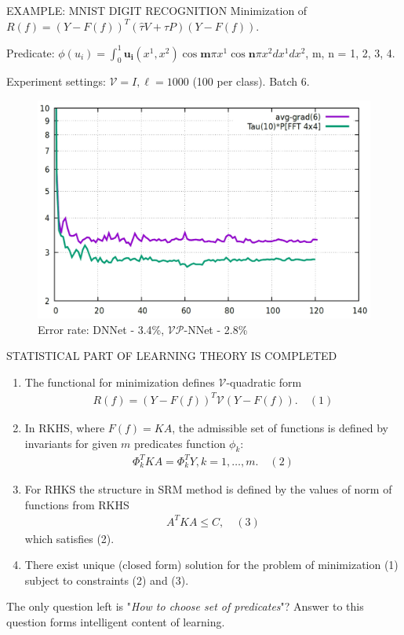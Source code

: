\documentclass[11pt]{beamer}
\begin{document}
\begin{frame}{EXAMPLE: MNIST DIGIT RECOGNITION}
Minimization of $R(f) = (Y - F(f))^{T}(\hat{\tau}V + \tau P)(Y - F(f))$.\\
\begin{center}
Predicate: $\phi(u_{i}) = \int_{0}^{1}\mathbf{u_{i}}(x^{1}, x^{2})\cos \mathbf{m}\pi x^{1}\cos \mathbf{n}\pi x^{2}dx^{1}dx^{2}$, m, n = 1, 2, 3, 4.
\end{center}
Experiment settings: $\mathcal{V} = I, \ell = 1000$ (100 per class). Batch 6.
\begin{figure}
\centering
\includegraphics[width=.8\linewidth]{Imgs/mnist-.predicate-3png}\\
Error rate: DNNet - 3.4\%, \quad $\mathcal{VP}$-NNet - 2.8\%
\end{figure}
\end{frame}

\begin{frame}{STATISTICAL PART OF LEARNING THEORY IS COMPLETED}
\begin{enumerate}
\item The functional for minimization defines $\mathcal{V}$-quadratic form
\begin{align*}
R(f) = (Y - F(f))^{T}\mathcal{V}(Y - F(f)). \quad (1)
\end{align*}
\item In RKHS, where $F(f) = KA$, the admissible set of functions is defined by invariants for given $m$ predicates function $\phi_{k}$:
\begin{align*}
\Phi_{k}^{T}KA = \Phi_{k}^{T}Y, k = 1, \ldots, m. \quad (2)
\end{align*}
\item For RHKS the structure in SRM method is defined by the values of norm of functions from RKHS
\begin{align*}
A^{T}KA \leq C, \quad (3)
\end{align*}
which satisfies (2).
\item There exist unique (closed form) solution for the problem of minimization (1) subject to constraints (2) and (3).
\end{enumerate}
The only question left is "\emph{How to choose set of predicates}"? Answer to this question forms intelligent content of learning.
\end{frame}
\end{document}
